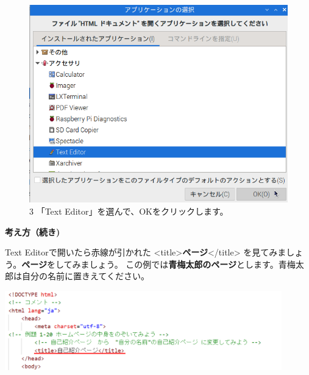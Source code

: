 \begin{figure}[ht]
\begin{minipage}{\textwidth}
    \begin{minipage}{0.45\linewidth}
      \includegraphics[width=\linewidth]{text01-img/textbook-img1042.png}\\
      3 「Text Editor」を選んで、OKをクリックします。
    \end{minipage}
  \end{minipage}


\end{figure}

\clearpage


\textbf{考え方（続き)}

Text Editorで開いたら赤線が引かれた
{\textless}title{\textgreater}\textbf{ページ}{\textless}/title{\textgreater}
を見てみましょう。\textbf{ページ}をしてみましょう。
この例では\textbf{青梅太郎のページ}とします。青梅太郎は自分の名前に置きえてください。


\centering
\includegraphics[width=0.9\textwidth]{text01-img/textbook-img146.png}



\bigskip

